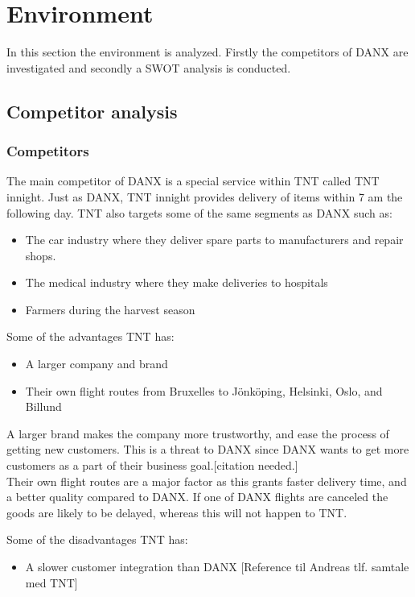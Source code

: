 \section{Environment}
In this section the environment is analyzed. Firstly the competitors of DANX are investigated and secondly a SWOT analysis is conducted.

\subsection{Competitor analysis}
\subsubsection{Competitors}
The main competitor of DANX is a special service within TNT called TNT innight.
Just as DANX, TNT innight provides delivery of items within 7 am the following day.
TNT also targets some of the same segments as DANX such as:

\begin{itemize}
\item The car industry where they deliver spare parts to manufacturers and repair shops.
\item The medical industry where they make deliveries to hospitals
\item Farmers during the harvest season
\end{itemize}

Some of the advantages TNT has:
\begin{itemize}
\item A larger company and brand
\item Their own flight routes\cite{webpage001} from Bruxelles to Jönköping, Helsinki, Oslo, and Billund
\end{itemize}

A larger brand makes the company more trustworthy, and ease the process of getting new customers. This is a threat to DANX since DANX wants to get more customers as a part of their business goal.[citation needed.]\\
Their own flight routes are a major factor as this grants faster delivery time, and a better quality compared to DANX. If one of DANX flights are canceled the goods are likely to be delayed, whereas this will not happen to TNT.

Some of the disadvantages TNT has:
\begin{itemize}
\item A slower customer integration than DANX [Reference til Andreas tlf. samtale med TNT]
\end{itemize}


